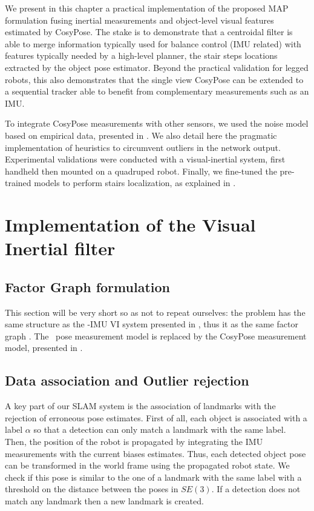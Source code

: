 We present in this chapter a practical implementation of the proposed MAP formulation fusing inertial measurements and object-level visual features estimated
by CosyPose. The stake is to demonstrate that a centroidal filter is able to merge information typically used for balance control (IMU related)
with features typically needed by a high-level planner, \eg the stair steps locations extracted by the object pose estimator.
Beyond the practical validation for legged robots, this also demonstrates that the single view CosyPose can be extended to a sequential
tracker able to benefit from complementary measurements such as an IMU.

To integrate CosyPose measurements with other sensors, we used the noise model based on empirical data, presented in . 
We also detail here the pragmatic implementation of heuristics to circumvent outliers in the network output. 
Experimental validations were conducted with a visual-inertial system, first handheld then mounted on a quadruped robot. Finally, we fine-tuned the pre-trained models 
to perform stairs localization, as explained in . 




\section{Implementation of the Visual Inertial filter}

\subsection{Factor Graph formulation}
This section will be very short so as not to repeat ourselves: the problem has the same structure as the \apriltag-IMU VI system presented in , 
thus it as the same factor graph . The \apriltag\ pose measurement model is replaced by the CosyPose measurement model, presented in .


\subsection{Data association and Outlier rejection}
A key part of our SLAM system is the association of landmarks with the rejection of erroneous pose estimates. First of all, each object is associated with a 
label $\alpha$ so that a detection can only match a landmark with the same label. Then, the position of the robot is propagated by integrating the IMU measurements 
with the current biases estimates. Thus, each detected object pose can be transformed in the world frame using the propagated robot state. We check if this pose is 
similar to the one of a landmark with the same label with a threshold on the distance between the poses in $SE(3)$. 
If a detection does not match any landmark then a new landmark is created.

